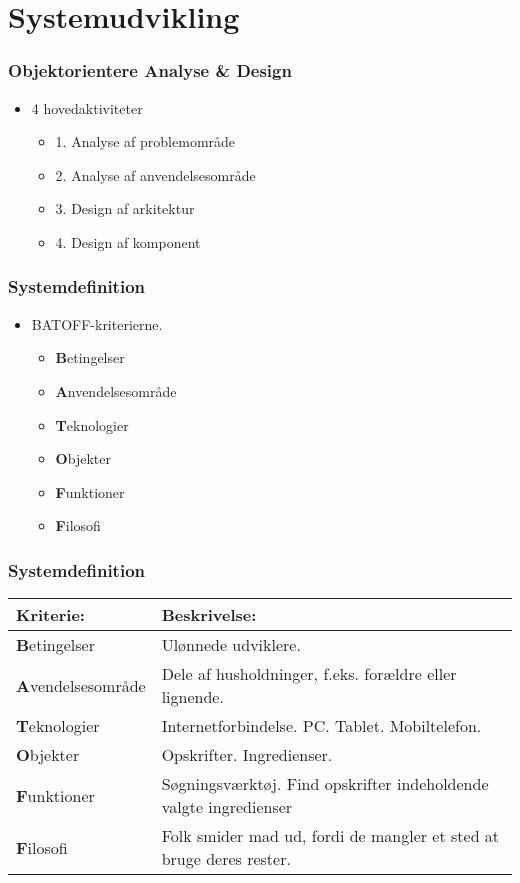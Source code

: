 \section{Systemudvikling}
	\begin{frame}
		\frametitle{Objektorientere Analyse \& Design}
		\begin{itemize}
			\item 4 hovedaktiviteter
			\begin{itemize}
				\item 1. Analyse af problemområde
				\item 2. Analyse af anvendelsesområde
				\item 3. Design af arkitektur
				\item 4. Design af komponent
			\end{itemize}
		\end{itemize}
	\end{frame}
	
	\begin{frame}
		\frametitle{Systemdefinition}
		\begin{itemize}
			\item  BATOFF-kriterierne.
				\begin{itemize}
				\item  \textbf{B}etingelser
				\item  \textbf{A}nvendelsesområde
				\item  \textbf{T}eknologier
				\item  \textbf{O}bjekter
				\item  \textbf{F}unktioner
				\item  \textbf{F}ilosofi
				\end{itemize}
		\end{itemize}
	\end{frame}
		
	\begin{frame}
		\frametitle{Systemdefinition}
		\begin{center}
    		\begin{tabular}{ | l | p{5cm} |} \hline
   				\textbf{Kriterie:} & \bf{Beskrivelse:} \\ \hline
    			\textbf{B}etingelser & Ulønnede udviklere. \\ \hline
    			\textbf{A}vendelsesområde & Dele af husholdninger, f.eks. forældre eller lignende. \\ \hline
    			\textbf{T}eknologier & Internetforbindelse. PC. Tablet. Mobiltelefon. \\ \hline
    			\textbf{O}bjekter & Opskrifter. Ingredienser. \\ \hline
    			\textbf{F}unktioner & Søgningsværktøj. Find opskrifter indeholdende valgte ingredienser \\ \hline
    			\textbf{F}ilosofi & Folk smider mad ud, fordi de mangler et sted at bruge deres rester. \\ \hline
    		\end{tabular}
		\end{center}
	\end{frame}

